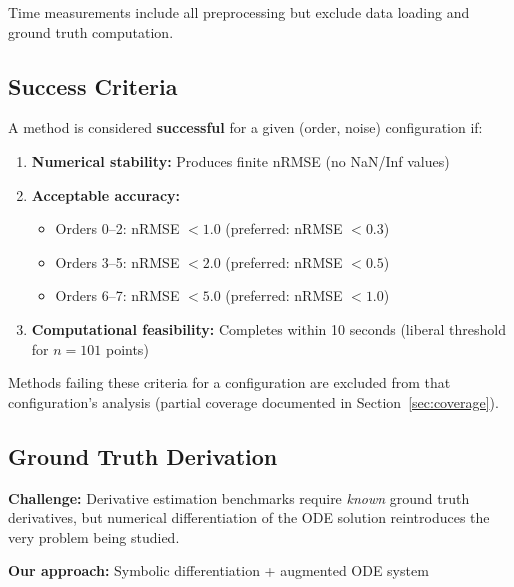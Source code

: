 Time measurements include all preprocessing but exclude data loading and ground truth computation.

\subsection{Success Criteria}
\label{sec:success_criteria}

A method is considered \textbf{successful} for a given (order, noise) configuration if:

\begin{enumerate}
    \item \textbf{Numerical stability:} Produces finite nRMSE (no NaN/Inf values)
    \item \textbf{Acceptable accuracy:}
    \begin{itemize}
        \item Orders 0--2: nRMSE $< 1.0$ (preferred: nRMSE $< 0.3$)
        \item Orders 3--5: nRMSE $< 2.0$ (preferred: nRMSE $< 0.5$)
        \item Orders 6--7: nRMSE $< 5.0$ (preferred: nRMSE $< 1.0$)
    \end{itemize}
    \item \textbf{Computational feasibility:} Completes within 10 seconds (liberal threshold for $n=101$ points)
\end{enumerate}

Methods failing these criteria for a configuration are excluded from that configuration's analysis (partial coverage documented in Section~\ref{sec:coverage}).

\subsection{Ground Truth Derivation}
\label{sec:ground_truth}

\textbf{Challenge:} Derivative estimation benchmarks require \textit{known} ground truth derivatives, but numerical differentiation of the ODE solution reintroduces the very problem being studied.

\textbf{Our approach:} Symbolic differentiation + augmented ODE system

